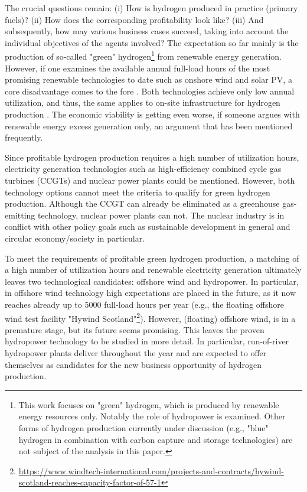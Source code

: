 \documentclass[review]{elsarticle}
\begin{document}
The crucial questions remain: (i) How is hydrogen produced in practice (primary fuels)? (ii) How does the corresponding profitability look like? (iii) And subsequently, how may various business cases succeed, taking into account the individual objectives of the agents involved? The expectation so far mainly is the production of so-called "green" hydrogen\footnote{This work focuses on "green" hydrogen, which is produced by renewable energy resources only. Notably the role of hydropower is examined. Other forms of hydrogen production currently under discussion (e.g., "blue" hydrogen in combination with carbon capture and storage technologies) are not subject of the analysis in this paper.} from renewable energy generation. However, if one examines the available annual full-load hours of the most promising renewable technologies to date such as onshore wind and solar PV, a core disadvantage comes to the fore \cite{ajanovic2018economic}. Both technologies achieve only low annual utilization, and thus, the same applies to on-site infrastructure for hydrogen production \cite{ball2015hydrogen}. The economic viability is getting even worse, if someone argues with renewable energy excess generation only, an argument that has been mentioned frequently.\vspace{0.3cm}

Since profitable hydrogen production requires a high number of utilization hours, electricity generation technologies such as high-efficiency combined cycle gas turbines (CCGTs) and nuclear power plants could be mentioned. However, both technology options cannot meet the criteria to qualify for green hydrogen production. Although the CCGT can already be eliminated as a greenhouse gas-emitting technology, nuclear power plants can not. The nuclear industry is in conflict with other policy goals such as sustainable development in general and circular economy/society in particular.\vspace{0.3cm}

To meet the requirements of profitable green hydrogen production, a matching of a high number of utilization hours and renewable electricity generation ultimately leaves two technological candidates: offshore wind and hydropower. In particular, in offshore wind technology high expectations are placed in the future, as it now reaches already up to \SI{5000}{} full-load hours per year (e.g., the floating offshore wind test facility "Hywind Scotland"\footnote{\url{https://www.windtech-international.com/projects-and-contracts/hywind-scotland-reaches-capacity-factor-of-57-1}}). However, (floating) offshore wind, is in a premature stage, but its future seems promising. This leaves the proven hydropower technology to be studied in more detail. In particular, run-of-river hydropower plants deliver throughout the year and are expected to offer themselves as candidates for the new business opportunity of hydrogen production.\vspace{0.3cm}
\end{document}
